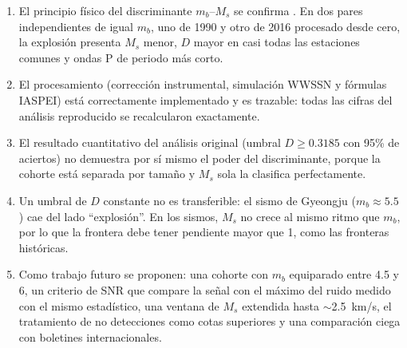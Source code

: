 \documentclass[letterpaper,12pt]{article}
\begin{document}
\begin{enumerate}
  \item El principio físico del discriminante $m_b$--$M_s$ se confirma \cite{stevens}. En dos pares independientes de igual $m_b$, uno de 1990 y otro de 2016 procesado desde cero, la explosión presenta $M_s$ menor, $D$ mayor en casi todas las estaciones comunes y ondas P de periodo más corto.
  \item El procesamiento (corrección instrumental, simulación WWSSN y fórmulas IASPEI) está correctamente implementado y es trazable: todas las cifras del análisis reproducido se recalcularon exactamente.
  \item El resultado cuantitativo del análisis original (umbral $D\geq0.3185$ con 95\% de aciertos) no demuestra por sí mismo el poder del discriminante, porque la cohorte está separada por tamaño y $M_s$ sola la clasifica perfectamente.
  \item Un umbral de $D$ constante no es transferible: el sismo de Gyeongju ($m_b\approx5.5$) cae del lado ``explosión''. En los sismos, $M_s$ no crece al mismo ritmo que $m_b$, por lo que la frontera debe tener pendiente mayor que 1, como las fronteras históricas.
  \item Como trabajo futuro se proponen: una cohorte con $m_b$ equiparado entre 4.5 y 6, un criterio de SNR que compare la señal con el máximo del ruido medido con el mismo estadístico, una ventana de $M_s$ extendida hasta $\sim$2.5~km/s, el tratamiento de no detecciones como cotas superiores y una comparación ciega con boletines internacionales.
\end{enumerate}
\end{document}
